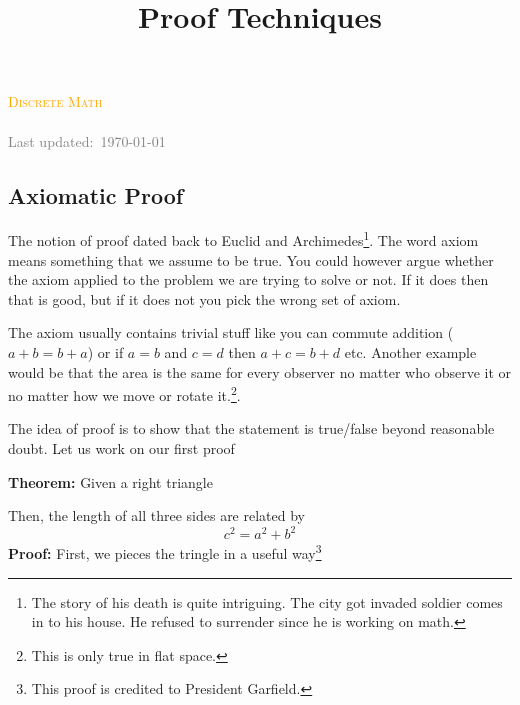 \documentclass[a4paper, 12pt]{article}
\title{Proof Techniques}
\newcommand{\theorem}{\noindent\textbf{Theorem:} }
\renewcommand{\proof}{\noindent\textbf{Proof:} }
\theoremstyle{examplestyle}
\newcommand{\course}{Discrete Math}
\begin{document}
\begin{center}
	\textcolor{orange}{\textsc{\course}}\\
	\huge\textbf{\textsc{\thetitle}}\\
	\small\textcolor{gray}{Last updated:\, \today \, \currenttime}\\
\end{center}

\begin{multicols}{2}
\section*{Axiomatic Proof}
The notion of proof dated back to Euclid and Archimedes\footnote{The story of his death is quite intriguing. The city got invaded soldier comes in to his house. He refused to surrender since he is working on math.}. The word axiom means something that we assume to be true. You could however argue whether the axiom applied to the problem we are trying to solve or not. If it does then that is good, but if it does not you pick the wrong set of axiom.

The axiom usually contains trivial stuff like you can commute addition ($a+b = b+a$) or if $a =b$ and $c=d$ then $a+c = b+d$ etc. Another example would be that the area is the same for every observer no matter who observe it or no matter how we move or rotate it.\footnote{This is only true in flat space.}.

The idea of proof is to show that the statement is true/false beyond reasonable doubt. Let us work on our first proof

\noindent\theorem Given a right triangle
	\begin{center}
	\end{center}
	Then, the length of all three sides are related by
	\[
		c^2 = a^2 + b^2
	\]
	\proof First, we pieces the tringle in a useful way\footnote{This proof is credited to President Garfield.}
	\begin{center}
\end{center}
\end{multicols}
\end{document}
